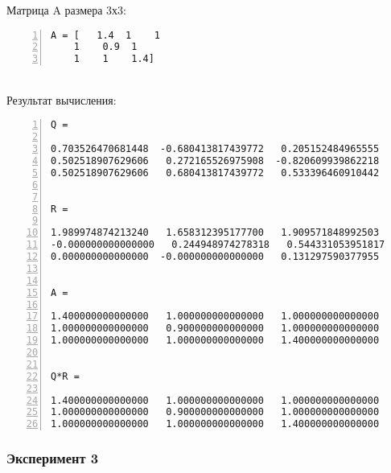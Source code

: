 \documentclass[14pt, titlepage, a4paper]{extarticle} %
\begin{document}
	Матрица A размера 3х3:
	\begin{Verbatim}[numbers=left,xleftmargin=0mm]
A = [   1.4  1    1
	1    0.9  1
	1    1    1.4]
	\end{Verbatim}
	~\\
	Результат вычисления:
	\begin{Verbatim}[numbers=left,xleftmargin=0mm]
Q =

0.703526470681448  -0.680413817439772   0.205152484965555
0.502518907629606   0.272165526975908  -0.820609939862218
0.502518907629606   0.680413817439772   0.533396460910442


R =

1.989974874213240   1.658312395177700   1.909571848992503
-0.000000000000000   0.244948974278318   0.544331053951817
0.000000000000000  -0.000000000000000   0.131297590377955


A =

1.400000000000000   1.000000000000000   1.000000000000000
1.000000000000000   0.900000000000000   1.000000000000000
1.000000000000000   1.000000000000000   1.400000000000000


Q*R =

1.400000000000000   1.000000000000000   1.000000000000000
1.000000000000000   0.900000000000000   1.000000000000000
1.000000000000000   1.000000000000000   1.400000000000000
	\end{Verbatim}

\pagebreak
	\subsubsection*{Эксперимент 3}
	
\end{document}
